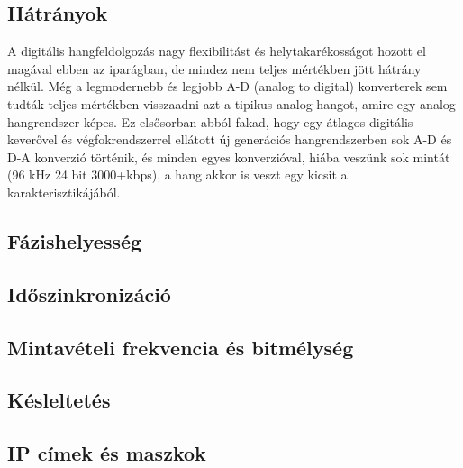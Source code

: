 \subsection{Hátrányok}
A digitális hangfeldolgozás nagy flexibilitást és helytakarékosságot hozott el
magával ebben az iparágban, de mindez nem teljes mértékben jött hátrány nélkül.
Még a legmodernebb és legjobb A-D (analog to digital) konverterek sem tudták
teljes mértékben visszaadni azt a tipikus analog hangot, amire egy analog
hangrendszer képes. Ez elsősorban abból fakad, hogy egy átlagos digitális
keverővel és végfokrendszerrel ellátott új generációs hangrendszerben sok A-D és
D-A konverzió történik, és minden egyes konverzióval, hiába veszünk sok mintát
(96 kHz 24 bit 3000+kbps), a hang akkor is veszt egy kicsit a
karakterisztikájából.
\subsection{Fázishelyesség}

\subsection{Időszinkronizáció}

\subsection{Mintavételi frekvencia és bitmélység}

\subsection{Késleltetés}

\subsection{IP címek és maszkok}

